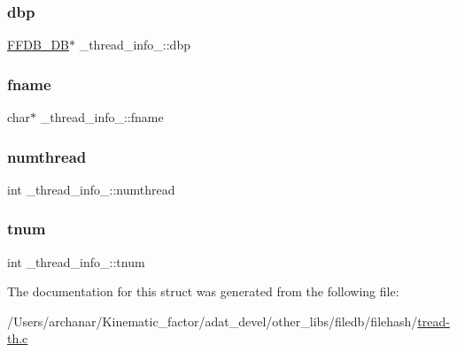 \subsubsection{\texorpdfstring{dbp}{dbp}}
{\footnotesize\ttfamily \mbox{\hyperlink{other__libs_2filedb_2filehash_2ffdb__db_8h_a0b27b956926453a7a8141ea8e10f0df8}{F\+F\+D\+B\+\_\+\+DB}}$\ast$ \+\_\+thread\+\_\+info\+\_\+\+::dbp}

\mbox{\label{struct__thread__info___ad5f4067013f0687bbe744ce75e31ecab}} 
\subsubsection{\texorpdfstring{fname}{fname}}
{\footnotesize\ttfamily char$\ast$ \+\_\+thread\+\_\+info\+\_\+\+::fname}

\mbox{\label{struct__thread__info___a5cdfeeb0597f6b8b0cc359894fbae6cc}} 
\subsubsection{\texorpdfstring{numthread}{numthread}}
{\footnotesize\ttfamily int \+\_\+thread\+\_\+info\+\_\+\+::numthread}

\mbox{\label{struct__thread__info___a6a6d76906fe855601083b5ca283faf18}} 
\subsubsection{\texorpdfstring{tnum}{tnum}}
{\footnotesize\ttfamily int \+\_\+thread\+\_\+info\+\_\+\+::tnum}



The documentation for this struct was generated from the following file\+:\begin{DoxyCompactItemize}
\item 
/\+Users/archanar/\+Kinematic\+\_\+factor/adat\+\_\+devel/other\+\_\+libs/filedb/filehash/\mbox{\hyperlink{tread-th_8c}{tread-\/th.\+c}}\end{DoxyCompactItemize}
